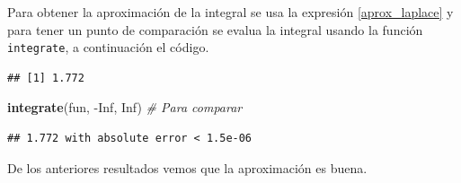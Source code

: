 \documentclass[10pt,]{krantz}
\makeatletter
\newenvironment{Shaded}{\begin{snugshade}}{\end{snugshade}}
\newcommand{\KeywordTok}[1]{\textcolor[rgb]{0.13,0.29,0.53}{\textbf{{#1}}}}
\newcommand{\DecValTok}[1]{\textcolor[rgb]{0.00,0.00,0.81}{{#1}}}
\newcommand{\StringTok}[1]{\textcolor[rgb]{0.31,0.60,0.02}{{#1}}}
\newcommand{\CommentTok}[1]{\textcolor[rgb]{0.56,0.35,0.01}{\textit{{#1}}}}
\newcommand{\OtherTok}[1]{\textcolor[rgb]{0.56,0.35,0.01}{{#1}}}
\newcommand{\NormalTok}[1]{{#1}}
\newenvironment{kframe}{%
\medskip{}
\setlength{\fboxsep}{.8em}
 \def\at@end@of@kframe{}%
 \ifinner\ifhmode%
  \def\at@end@of@kframe{\end{minipage}}%
  \begin{minipage}{\columnwidth}%
 \fi\fi%
 \def\FrameCommand##1{\hskip\@totalleftmargin \hskip-\fboxsep
 \colorbox{shadecolor}{##1}\hskip-\fboxsep
     \hskip-\linewidth \hskip-\@totalleftmargin \hskip\columnwidth}%
 \MakeFramed {\advance\hsize-\width
   \@totalleftmargin\z@ \linewidth\hsize
   \@setminipage}}%
 {\par\unskip\endMakeFramed%
 \at@end@of@kframe}
\renewenvironment{Shaded}{\begin{kframe}}{\end{kframe}}
\makeatother
\begin{document}
\begin{Shaded}
\end{Shaded}

Para obtener la aproximación de la integral se usa la expresión
\ref{aprox_laplace} y para tener un punto de comparación se evalua la
integral usando la función \texttt{integrate}, a continuación el código.

\begin{Shaded}
\end{Shaded}

\begin{verbatim}
## [1] 1.772
\end{verbatim}

\begin{Shaded}
\begin{Highlighting}[]
\KeywordTok{integrate}\NormalTok{(fun, -}\OtherTok{Inf}\NormalTok{, }\OtherTok{Inf}\NormalTok{)  }\CommentTok{# Para comparar}
\end{Highlighting}
\end{Shaded}

\begin{verbatim}
## 1.772 with absolute error < 1.5e-06
\end{verbatim}

De los anteriores resultados vemos que la aproximación es buena.



\backmatter
\printindex
\end{document}
